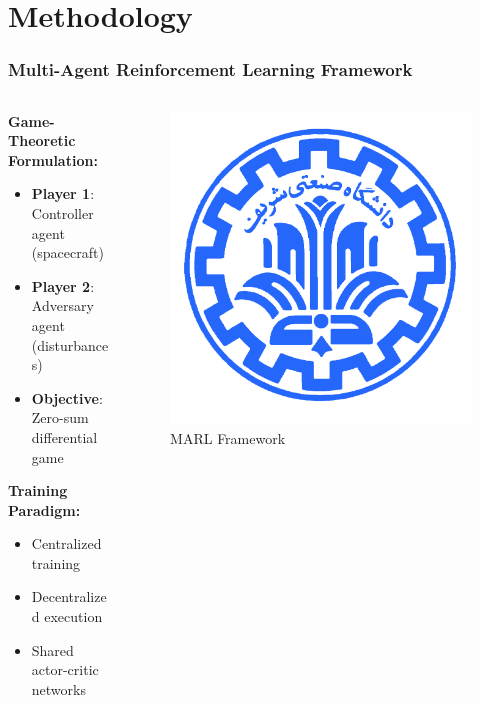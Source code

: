 \documentclass[
    11pt, %
    aspectratio=169, %
]{beamer}
\begin{document}
\section{Methodology}

\begin{frame}
	\frametitle{Multi-Agent Reinforcement Learning Framework}
	
	\begin{columns}[t]
		\begin{column}{0.6\textwidth}
			\textbf{Game-Theoretic Formulation:}
			\begin{itemize}
				\item \textbf{Player 1}: Controller agent (spacecraft)
				\item \textbf{Player 2}: Adversary agent (disturbances)
				\item \textbf{Objective}: Zero-sum differential game
			\end{itemize}
			
			\vspace{0.3cm}
			\textbf{Training Paradigm:}
			\begin{itemize}
				\item Centralized training
				\item Decentralized execution
				\item Shared actor-critic networks
			\end{itemize}
		\end{column}
		\begin{column}{0.4\textwidth}
			\begin{figure}
				\centering
				\includegraphics[width=\textwidth]{framework_diagram.png}
				\caption{MARL Framework}
			\end{figure}
		\end{column}
	\end{columns}
	

\end{frame}
\end{document}
